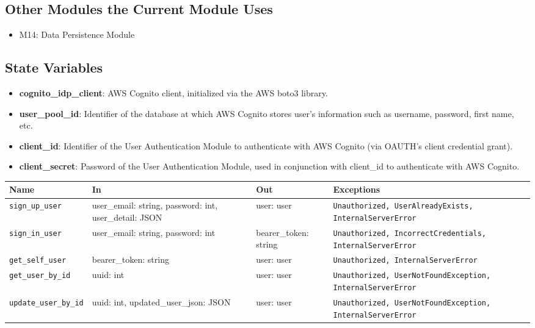 \documentclass[12pt, titlepage]{article}
\begin{document}
\subsection{Other Modules the Current Module Uses}
\begin{itemize}
    \item M14: Data Persistence Module
\end{itemize}

\subsection{State Variables}
\begin{itemize}
    \item \textbf{cognito\_idp\_client}: AWS Cognito client, initialized via the AWS boto3 library.
    \item \textbf{user\_pool\_id}: Identifier of the database at which AWS Cognito stores user's information such as username, password, first name, etc.
    \item \textbf{client\_id}: Identifier of the User Authentication Module to authenticate with AWS Cognito (via OAUTH's client credential grant).
    \item \textbf{client\_secret}: Password of the User Authentication Module, used in conjunction with client\_id to authenticate with AWS Cognito.
\end{itemize}

\begin{center}
  \renewcommand{\arraystretch}{1.3}
  \setlength{\tabcolsep}{4pt}

  \begin{tabular}{|p{4cm}|p{4cm}|p{4cm}|p{5cm}|}
    \hline
    \textbf{Name} & \textbf{In} & \textbf{Out} & \textbf{Exceptions} \\
    \hline 
    \texttt{sign\_up\_user} & user\_email: string, \newline password: int, \newline user\_detail: JSON & user: user & \texttt{Unauthorized, UserAlreadyExists, InternalServerError} \\
    \hline
    \texttt{sign\_in\_user} & user\_email: string, \newline password: int & bearer\_token: string & \texttt{Unauthorized, IncorrectCredentials, InternalServerError} \\
    \hline
    \texttt{get\_self\_user} & bearer\_token: string & user: user & \texttt{Unauthorized, InternalServerError} \\
    \hline
    \texttt{get\_user\_by\_id} & uuid: int & user: user & \texttt{Unauthorized, UserNotFoundException, InternalServerError} \\
    \hline
    \texttt{update\_user\_by\_id} & uuid: int, \newline updated\_user\_json: JSON & user: user & \texttt{Unauthorized, UserNotFoundException, InternalServerError} \\
    \hline
  \end{tabular}
\end{center}
\end{document}
